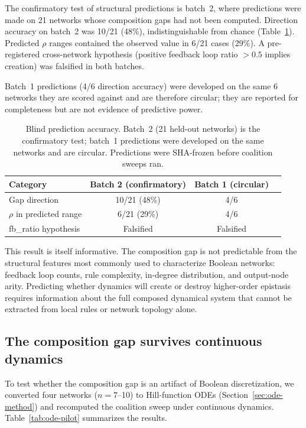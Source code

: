 \documentclass[10pt]{article}
\begin{document}
The confirmatory test of structural predictions is batch~2, where
predictions were made on 21 networks whose composition gaps had not
been computed. Direction accuracy on batch~2 was 10/21 (48\%),
indistinguishable from chance (Table~\ref{tab:blind}). Predicted
$\rho$ ranges contained the observed value in 6/21 cases (29\%). A
pre-registered cross-network hypothesis (positive feedback loop ratio
$> 0.5$ implies creation) was falsified in both batches.

Batch~1 predictions (4/6 direction accuracy) were developed on the
same 6 networks they are scored against and are therefore circular;
they are reported for completeness but are not evidence of predictive
power.

\begin{table}[t]
\centering
\caption{Blind prediction accuracy. Batch~2 (21 held-out networks) is
the confirmatory test; batch~1 predictions were developed on the same
networks and are circular. Predictions were SHA-frozen before
coalition sweeps ran.}
\label{tab:blind}
\begin{tabular}{lccc}
\toprule
Category & Batch 2 (confirmatory) & Batch 1 (circular) \\
\midrule
Gap direction & 10/21 (48\%) & 4/6 \\
$\rho$ in predicted range & 6/21 (29\%) & 4/6 \\
fb\_ratio hypothesis & Falsified & Falsified \\
\bottomrule
\end{tabular}
\end{table}

This result is itself informative. The composition gap is not
predictable from the structural features most commonly used to
characterize Boolean networks: feedback loop counts, rule complexity,
in-degree distribution, and output-node arity. Predicting whether
dynamics will create or destroy higher-order epistasis requires
information about the full composed dynamical system that cannot be
extracted from local rules or network topology alone.


\subsection{The composition gap survives continuous dynamics}
\label{sec:ode-results}

To test whether the composition gap is an artifact of Boolean
discretization, we converted four networks ($n = 7$--10) to
Hill-function ODEs (Section~\ref{sec:ode-method}) and recomputed
the coalition sweep under continuous dynamics.
Table~\ref{tab:ode-pilot} summarizes the results.
\end{document}
